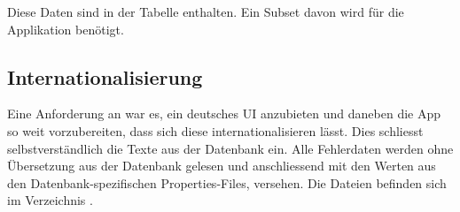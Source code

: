Diese Daten sind in der Tabelle  enthalten.
Ein Subset davon wird für die Applikation benötigt.

\subsection{Internationalisierung}
\label{datenquellen-internationalisierung}
Eine Anforderung an \kort{} war es, ein deutsches UI anzubieten und daneben die App so weit vorzubereiten, dass sich diese internationalisieren lässt.
Dies schliesst selbstverständlich die Texte aus der Datenbank ein.
Alle Fehlerdaten werden ohne Übersetzung aus der Datenbank gelesen und anschliessend mit den Werten aus den Datenbank-spezifischen Properties-Files, versehen.
Die Dateien befinden sich im Verzeichnis .